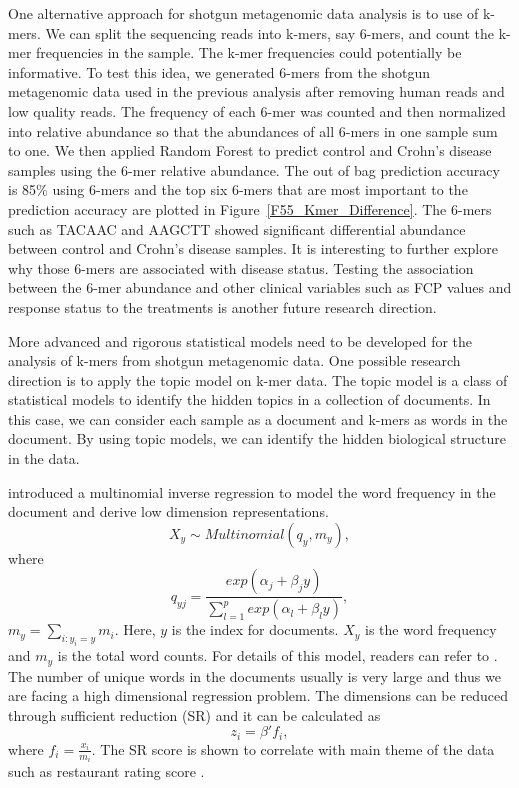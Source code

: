 One alternative approach for shotgun metagenomic data analysis is to use of k-mers. We can split the sequencing reads into k-mers, say 6-mers, and count the k-mer frequencies in the sample. The k-mer frequencies could  potentially be informative. To test this idea, we generated 6-mers from the shotgun metagenomic data used in the previous analysis after removing human reads and low quality reads.  The  frequency of each 6-mer was counted and then normalized into relative abundance so that the abundances of all 6-mers in one sample sum to one. We then applied Random Forest to predict control and Crohn's disease samples using the 6-mer relative abundance. The out of bag prediction accuracy is 85\% using 6-mers and the top six 6-mers that are most important to the prediction accuracy are plotted in Figure~\ref{F55_Kmer_Difference}. The 6-mers such as TACAAC and AAGCTT showed significant differential abundance between control and Crohn's disease samples. It is interesting to further explore why those 6-mers are associated with disease status. Testing the association between the 6-mer abundance and other clinical variables such as FCP values and response status to the treatments is another future research direction. 

More advanced and rigorous statistical models need to be developed for the analysis of k-mers from shotgun metagenomic data. One possible research direction is to apply the topic model on k-mer data. The topic model is a class of statistical models to identify the hidden topics in a collection of documents. In this case, we can consider each sample as a document and k-mers as words in the document. By using topic models, we can identify the hidden biological structure in the data. 

\citet{taddy2013multinomial} introduced a multinomial inverse regression to model the word frequency in the document and derive low dimension representations.
\begin{equation*}
X_y \sim Multinomial(q_y,m_y),
\end{equation*}
where $$q_{yj} = \frac{exp(\alpha_j+\beta_jy)}{\sum_{l=1}^{p}exp(\alpha_l+\beta_ly)},$$
$m_y = \sum_{i:y_i=y}m_i$.
Here, $y$ is the index for documents. $X_y$ is the word frequency and $m_y$ is the total word counts. For details of this model, readers can refer to \citet{taddy2013multinomial}.
The number of unique words in the documents usually is very large and thus we are facing a high dimensional regression problem. The dimensions  can be reduced through sufficient reduction (SR) and it can be calculated as 
\begin{equation*}
z_i = \beta'f_i,
\end{equation*}
where $f_i = \frac{x_i}{m_i}$.
The SR score is shown to correlate with main theme of the data such as restaurant rating score \citep{taddy2013multinomial}. 

